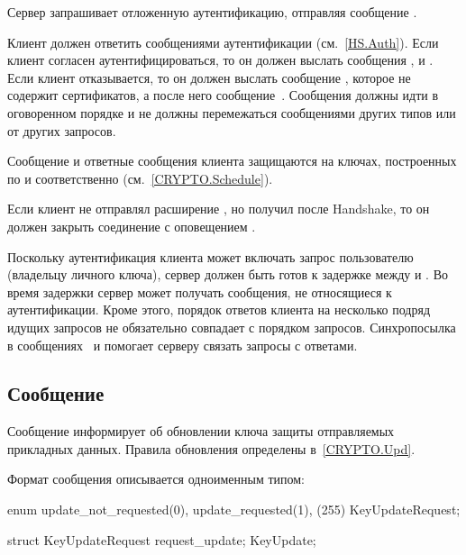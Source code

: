 
Сервер запрашивает отложенную аутентификацию, отправляя сообщение 
. 

Клиент должен ответить сообщениями аутентификации (см.~\ref{HS.Auth}). 
%
Если клиент согласен аутентифицироваться, то он должен выслать сообщения
,  и 
. 
%
Если клиент отказывается, то он должен выслать сообщение 
, которое не содержит сертификатов,
а после него сообщение~. 
%
Сообщения должны идти в оговоренном порядке и не должны перемежаться 
сообщениями других типов или от других запросов.


Сообщение  и ответные сообщения клиента
защищаются на ключах, построенных по 
и  соответственно
(см.~\ref{CRYPTO.Schedule}). 

Если клиент не отправлял расширение ,
но получил  после Handshake, то он должен 
закрыть соединение с оповещением .

Поскольку аутентификация клиента может включать запрос пользователю (владельцу 
личного ключа), сервер должен быть готов к задержке между 
 и .
Во время задержки сервер может получать сообщения, не относящиеся к 
аутентификации.
%
Кроме этого, порядок ответов клиента на несколько подряд идущих запросов 
 не обязательно совпадает с порядком запросов.
%
Синхропосылка  в 
сообщениях~ и    
помогает серверу связать запросы с ответами.

\subsection{Сообщение }\label{HS.KU} 

Сообщение  информирует об обновлении ключа защиты 
отправляемых прикладных данных. Правила обновления определены 
в~\ref{CRYPTO.Upd}. 

Формат сообщения  описывается одноименным типом:
%
\begin{codeblock}
enum {
  update_not_requested(0), update_requested(1), (255)
} KeyUpdateRequest;

struct {
  KeyUpdateRequest request_update;
} KeyUpdate;
\end{codeblock}

